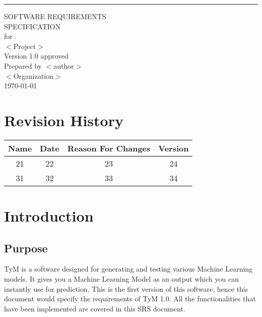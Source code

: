 \documentclass{scrreprt}
\date{}
\def\myversion{1.0 }
\begin{document}
\begin{flushright}
    \rule{16cm}{5pt}\vskip1cm
    \begin{bfseries}
        \Huge{SOFTWARE REQUIREMENTS\\ SPECIFICATION}\\
        \vspace{1.9cm}
        for\\
        \vspace{1.9cm}
        $<$Project$>$\\
        \vspace{1.9cm}
        \LARGE{Version \myversion approved}\\
        \vspace{1.9cm}
        Prepared by $<$author$>$\\
        \vspace{1.9cm}
        $<$Organization$>$\\
        \vspace{1.9cm}
        \today\\
    \end{bfseries}
\end{flushright}

\tableofcontents


\chapter*{Revision History}

\begin{center}
    \begin{tabular}{|c|c|c|c|}
        \hline
	    Name & Date & Reason For Changes & Version\\
        \hline
	    21 & 22 & 23 & 24\\
        \hline
	    31 & 32 & 33 & 34\\
        \hline
    \end{tabular}
\end{center}

\chapter{Introduction}

\section{Purpose}
TyM is a software designed for generating and testing various Machine Learning models. It gives you a Machine Learning Model as an output which you can instantly use for prediction. This is the first version of this software, hence this document would specify the requirements of TyM 1.0. All the functionalities that have been implemented are covered in this SRS document.
\end{document}
